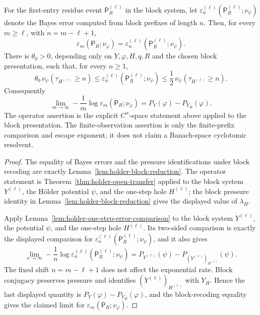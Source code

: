 \begin{theorem}
For the first-entry residue event \(\mathsf P_R^{(\ell)}\) in the block
system, let
\(\varepsilon_n^{(\ell)}(\mathsf P_R^{(\ell)};\nu_{\psi})\) denote the
Bayes error computed from block prefixes of length \(n\).  Then, for
every \(m\geq\ell\), with \(n=m-\ell+1\),
\[
  \varepsilon_m(\mathsf P_R;\nu_\varphi)
  =
  \varepsilon_n^{(\ell)}
    (\mathsf P_R^{(\ell)};\nu_{\psi}).
\]
There is \(\theta_0>0\), depending only on \(Y,\varphi,H,q,R\) and the
chosen block presentation, such that, for every \(n\geq1\),
\[
  \theta_0\,\nu_{\psi}(\tau_{H^{(\ell)}}\geq n)
  \leq
  \varepsilon_n^{(\ell)}
    (\mathsf P_R^{(\ell)};\nu_{\psi})
  \leq
  \frac12\,\nu_{\psi}(\tau_{H^{(\ell)}}\geq n).
\]
Consequently
\[
  \lim_{m\to\infty}
  -\frac1m\log
  \varepsilon_m(\mathsf P_R;\nu_\varphi)
  =
  P_Y(\varphi)-P_{Y_H}(\varphi).
\]
The operator assertion is the explicit \(C^\alpha\)-space statement
above applied to the block presentation.  The finite-observation
assertion is only the finite-prefix comparison and escape exponent; it
does not claim a Banach-space cyclotomic resolvent.
\end{theorem}

\begin{proof}
The equality of Bayes errors and the pressure identifications under
block recoding are exactly Lemma~\ref{lem:holder-block-reduction}.  The
operator statement is Theorem~\ref{thm:holder-open-transfer} applied to
the block system \(Y^{(\ell)}\), the H\"older potential \(\psi\), and the
one-step hole \(H^{(\ell)}\); the block pressure identity in
Lemma~\ref{lem:holder-block-reduction} gives the displayed value of
\(\lambda_H\).

Apply Lemma~\ref{lem:holder-one-step-error-comparison} to the block
system \(Y^{(\ell)}\), the potential \(\psi\), and the one-step hole
\(H^{(\ell)}\).  Its two-sided comparison is exactly the displayed
comparison for
\(\varepsilon_n^{(\ell)}(\mathsf P_R^{(\ell)};\nu_\psi)\), and it also
gives
\[
  \lim_{n\to\infty}
  -\frac1n\log
  \varepsilon_n^{(\ell)}(\mathsf P_R^{(\ell)};\nu_\psi)
  =
  P_{Y^{(\ell)}}(\psi)
  -P_{(Y^{(\ell)})_{H^{(\ell)}}}(\psi).
\]
The fixed shift \(n=m-\ell+1\) does not affect the exponential rate.
Block conjugacy preserves pressure and identifies
\((Y^{(\ell)})_{H^{(\ell)}}\) with \(Y_H\).  Hence the last displayed
quantity is \(P_Y(\varphi)-P_{Y_H}(\varphi)\), and the block-recoding
equality gives the claimed limit for
\(\varepsilon_m(\mathsf P_R;\nu_\varphi)\).
\end{proof}
